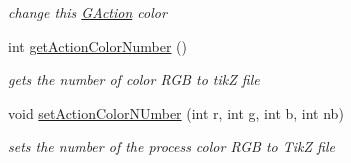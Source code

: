 \begin{DoxyCompactItemize}
\begin{DoxyCompactList}\small\item\em change this \hyperlink{classGAction}{G\+Action} color \end{DoxyCompactList}\item 
\hypertarget{classGAction_ade1234868fc1ba2b4c5ee1ff7c3ae998}{int \hyperlink{classGAction_ade1234868fc1ba2b4c5ee1ff7c3ae998}{get\+Action\+Color\+Number} ()}\label{classGAction_ade1234868fc1ba2b4c5ee1ff7c3ae998}

\begin{DoxyCompactList}\small\item\em gets the number of color R\+G\+B to tik\+Z file \end{DoxyCompactList}\item 
\hypertarget{classGAction_adfc489f6845c5e9ffa9d361984f5993a}{void \hyperlink{classGAction_adfc489f6845c5e9ffa9d361984f5993a}{set\+Action\+Color\+N\+Umber} (int r, int g, int b, int nb)}\label{classGAction_adfc489f6845c5e9ffa9d361984f5993a}

\begin{DoxyCompactList}\small\item\em sets the number of the process color R\+G\+B to Tik\+Z file \end{DoxyCompactList}\end{DoxyCompactItemize}
